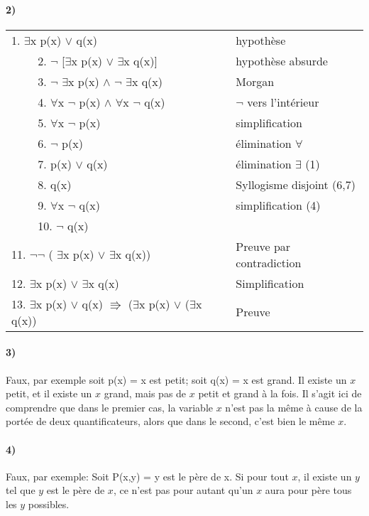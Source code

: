     \paragraph{2)}
        \begin{tabular}{|l|l|}
        \hline
        1. $\exists$x p(x) $\lor$ q(x) & hypothèse \\
        $\qquad$ 2. $\neg$ [$\exists$x p(x) $\lor$ $\exists$x q(x)] & hypothèse absurde\\
        $\qquad$ 3. $\neg$ $\exists$x p(x) $\land$ $\neg$ $\exists$x q(x) & Morgan\\
        $\qquad$ 4. $\forall$x $\neg$ p(x) $\land$ $\forall$x $\neg$ q(x) & $\neg$ vers l'intérieur\\
        $\qquad$ 5. $\forall$x $\neg$ p(x) & simplification\\
        $\qquad$ 6. $\neg$ p(x) & élimination $\forall$\\
        $\qquad$ 7. p(x) $\lor$ q(x) & élimination $\exists$ (1)\\
        $\qquad$ 8. q(x) & Syllogisme disjoint (6,7)\\
        $\qquad$ 9. $\forall$x $\neg$ q(x) & simplification (4)\\
        $\qquad$ 10. $\neg$ q(x) & \\
        11. $\neg \neg$ ( $\exists$x p(x) $\lor$ $\exists$x q(x)) & Preuve par contradiction\\
        12. $\exists$x p(x) $\lor$ $\exists$x q(x)& Simplification\\
        13. $\exists$x p(x) $\lor$ q(x) $\Rrightarrow$ ($\exists$x p(x) $\lor$ ($\exists$x q(x)) & Preuve\\
        \hline
        \end{tabular}
        
    \paragraph{3)}
        Faux, par exemple soit p(x) = x est petit;
        soit q(x) = x est grand. Il existe un $x$ petit, et il existe un $x$ grand, mais pas de $x$ petit et grand à la fois. Il s'agit ici de comprendre que dans le premier cas, la variable $x$ n'est pas la même à cause de la portée de deux quantificateurs, alors que dans le second, c'est bien le même $x$.
        
    \paragraph{4)}
        Faux, par exemple:
        Soit P(x,y) = y est le père de x.
        Si pour tout $x$, il existe un $y$ tel que $y$ est le père de $x$, ce n'est pas pour autant qu'un $x$ aura pour père tous les $y$ possibles.
        
